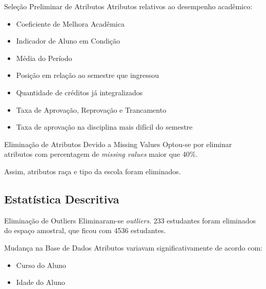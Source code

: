 \begin{frame}{Seleção Preliminar de Atributos}
    Atributos relativos ao desempenho acadêmico: 
    \begin{itemize}
        \item Coeficiente de Melhora Acadêmica
        \item Indicador de Aluno em Condição
        \item Média do Período
        \item Posição em relação ao semestre que ingressou
        \item Quantidade de créditos já integralizados
        \item Taxa de Aprovação, Reprovação e Trancamento
        \item Taxa de aprovação na disciplina mais difícil do semestre
    \end{itemize}
\end{frame}

\begin{frame}{Eliminação de Atributos Devido a Missing Values}
    Optou-se por eliminar atributos com percentagem de \textit{missing values} maior que 40\%.
        
    \vspace{0.5cm}
    
    Assim, atributos raça e tipo da escola foram eliminados. 
\end{frame}

\subsection{Estatística Descritiva}
\begin{frame}{Eliminação de Outliers}
    Eliminaram-se \textit{outliers}. 233 estudantes foram eliminados do espaço amostral,
    que ficou com 4536 estudantes.  
\end{frame}

\begin{frame}{Mudança na Base de Dados}
    Atributos variavam significativamente de acordo com: 
    \begin{itemize}
        \item Curso do Aluno
        \item Idade do Aluno
    \end{itemize}
\end{frame}

